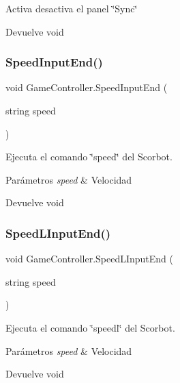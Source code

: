 Activa desactiva el panel \char`\"{}\+Sync\char`\"{} \begin{DoxyReturn}{Devuelve}
void 
\end{DoxyReturn}
\mbox{\label{class_game_controller_a7a993b5ee6e6376f81670d3958d48bb6}} 
\subsubsection{\texorpdfstring{SpeedInputEnd()}{SpeedInputEnd()}}
{\footnotesize\ttfamily void Game\+Controller.\+Speed\+Input\+End (\begin{DoxyParamCaption}\item[{string}]{speed }\end{DoxyParamCaption})\hspace{0.3cm}{\ttfamily [inline]}}

Ejecuta el comando \char`\"{}speed\char`\"{} del Scorbot. 
\begin{DoxyParams}{Parámetros}
{\em speed} & Velocidad \\
\hline
\end{DoxyParams}
\begin{DoxyReturn}{Devuelve}
void 
\end{DoxyReturn}
\mbox{\label{class_game_controller_aa10e8ec20019adfd8f3c2dfbea4ff8bc}} 
\subsubsection{\texorpdfstring{SpeedLInputEnd()}{SpeedLInputEnd()}}
{\footnotesize\ttfamily void Game\+Controller.\+Speed\+L\+Input\+End (\begin{DoxyParamCaption}\item[{string}]{speed }\end{DoxyParamCaption})\hspace{0.3cm}{\ttfamily [inline]}}

Ejecuta el comando \char`\"{}speedl\char`\"{} del Scorbot. 
\begin{DoxyParams}{Parámetros}
{\em speed} & Velocidad \\
\hline
\end{DoxyParams}
\begin{DoxyReturn}{Devuelve}
void 
\end{DoxyReturn}
\mbox{\label{class_game_controller_ab42ee9c1c07fc60cb506b769bd6047c9}} 
